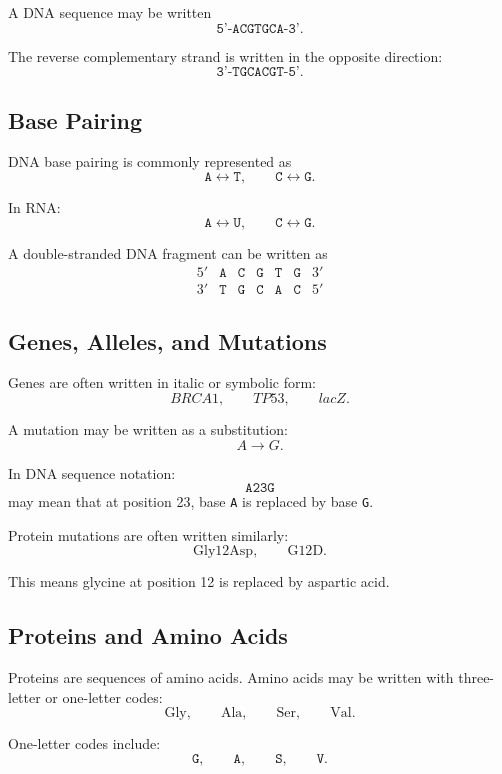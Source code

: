 \documentclass[11pt,twocolumn]{article}
\begin{document}
A DNA sequence may be written
\[
\texttt{5'-ACGTGCA-3'}.
\]

The reverse complementary strand is written in the opposite direction:
\[
\texttt{3'-TGCACGT-5'}.
\]

\subsection{Base Pairing}

DNA base pairing is commonly represented as
\[
\texttt{A}\leftrightarrow\texttt{T},
\qquad
\texttt{C}\leftrightarrow\texttt{G}.
\]

In RNA:
\[
\texttt{A}\leftrightarrow\texttt{U},
\qquad
\texttt{C}\leftrightarrow\texttt{G}.
\]

A double-stranded DNA fragment can be written as
\[
\begin{array}{ccccccc}
5' & \texttt{A} & \texttt{C} & \texttt{G} & \texttt{T} & \texttt{G} & 3'\\
3' & \texttt{T} & \texttt{G} & \texttt{C} & \texttt{A} & \texttt{C} & 5'
\end{array}
\]

\subsection{Genes, Alleles, and Mutations}

Genes are often written in italic or symbolic form:
\[
BRCA1,
\qquad
TP53,
\qquad
lacZ.
\]

A mutation may be written as a substitution:
\[
A \to G.
\]

In DNA sequence notation:
\[
\texttt{A23G}
\]
may mean that at position 23, base \texttt{A} is replaced by base \texttt{G}.

Protein mutations are often written similarly:
\[
\mathrm{Gly12Asp},
\qquad
\mathrm{G12D}.
\]

This means glycine at position 12 is replaced by aspartic acid.

\subsection{Proteins and Amino Acids}

Proteins are sequences of amino acids. Amino acids may be written with
three-letter or one-letter codes:
\[
\mathrm{Gly},
\qquad
\mathrm{Ala},
\qquad
\mathrm{Ser},
\qquad
\mathrm{Val}.
\]

One-letter codes include:
\[
\texttt{G},
\qquad
\texttt{A},
\qquad
\texttt{S},
\qquad
\texttt{V}.
\]
\end{document}

